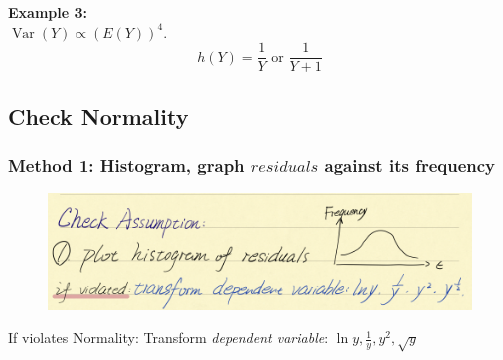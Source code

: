 \documentclass[11pt,a4paper]{article}
\begin{document}
\textbf{Example 3:}\\
$\operatorname{Var}(Y) \propto(E(Y))^{4}$.\\
$$h(Y)=\frac{1}{Y}\text{ or }\frac{1}{Y+1}$$






\subsection{Check Normality}
\subsubsection{Method 1: Histogram, graph $residuals$ against its frequency}
\begin{center}\begin{figure}[htbp]
    \centering
    \includegraphics[scale=0.7]{check2.png}
    \caption{}
    \label{}
\end{figure}\end{center}
If violates Normality: Transform \textit{dependent variable}: $\ln{y}, \frac{1}{y},y^2,\sqrt{y}$
\end{document}
